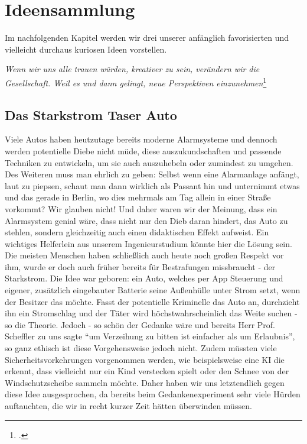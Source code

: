 \section{Ideensammlung}
Im nachfolgenden Kapitel werden wir drei unserer anfänglich favorisierten und vielleicht durchaus kuriosen Ideen vorstellen. 
\begin{center}
	\textit{Wenn wir uns alle trauen würden, kreativer zu sein, verändern wir die Gesellschaft. Weil es und dann gelingt, neue Perspektiven einzunehmen}\footcite{Bode2022}
\end{center}

\subsection{Das Starkstrom Taser Auto}
Viele Autos haben heutzutage bereits moderne Alarmsysteme und dennoch werden potentielle Diebe nicht müde, diese auszukundschaften und passende Techniken zu entwickeln, um sie auch auszuhebeln oder zumindest zu umgehen. Des Weiteren muss man ehrlich zu geben: Selbst wenn eine Alarmanlage anfängt, laut zu piepsen, schaut man dann wirklich als Passant hin und unternimmt etwas und das gerade in Berlin, wo dies mehrmals am Tag allein in einer Straße vorkommt? Wir glauben nicht! Und daher waren wir der Meinung, dass ein Alarmsystem genial wäre, dass nicht nur den Dieb daran hindert, das Auto zu stehlen, sondern gleichzeitig auch einen didaktischen Effekt aufweist. Ein wichtiges Helferlein aus unserem Ingenieurstudium könnte hier die Lösung sein. Die meisten Menschen haben schließlich auch heute noch großen Respekt vor ihm, wurde er doch auch früher bereits für Bestrafungen missbraucht - der Starkstrom. Die Idee war geboren: ein Auto, welches per App Steuerung und eigener, zusätzlich eingebauter Batterie seine Außenhülle unter Strom setzt, wenn der Besitzer das möchte. Fasst der potentielle Kriminelle das Auto an, durchzieht ihn ein Stromschlag und der Täter wird höchstwahrscheinlich das Weite suchen - so die Theorie. Jedoch - so schön der Gedanke wäre und bereits Herr Prof. Scheffler zu uns sagte “um Verzeihung zu bitten ist einfacher als um Erlaubnis”, so ganz ethisch ist diese Vorgehensweise jedoch nicht. Zudem müssten viele Sicherheitsvorkehrungen vorgenommen werden, wie beispielsweise eine KI die erkennt, dass vielleicht nur ein Kind verstecken spielt oder den Schnee von der Windschutzscheibe sammeln möchte. Daher haben wir uns letztendlich gegen diese Idee ausgesprochen, da bereits beim Gedankenexperiment sehr viele Hürden auftauchten, die wir in recht kurzer Zeit hätten überwinden müssen.

